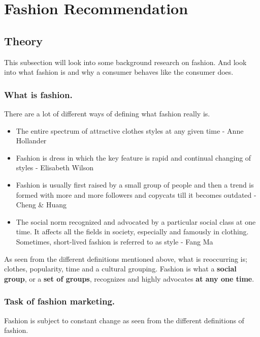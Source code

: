 
\section{Fashion Recommendation}


\subsection{Theory}
This subsection will look into some background research on fashion.  And look
into what fashion is and why a consumer behaves like the consumer does.

\subsubsection{What is fashion.}

There are a lot of different ways of defining what fashion really is.

\begin{itemize}
    \item The entire spectrum of attractive clothes styles at any given time -
    Anne Hollander
    \item Fashion is dress in which the key feature is rapid and continual
    changing of styles - Elisabeth Wilson
    \item Fashion is usually first raised by a small group of people and then a
    trend is formed with more and more followers and copycats till it becomes
    outdated - Cheng \& Huang
    \item The social norm recognized and advocated by a particular social class
    at one time. It affects all the fields in society, especially and famously
    in clothing. Sometimes, short-lived fashion is referred to as style - Fang
    Ma \cite{Fang2012}
\end{itemize}

As seen from the different definitions mentioned above, what is reoccurring is;
clothes, popularity, time and a cultural grouping. Fashion is what a
\textbf{social group}, or a \textbf{set of groups}, recognizes and highly
advocates \textbf{at any one time}.

\subsubsection{Task of fashion marketing.}
Fashion is subject to constant change as seen from the different definitions of
fashion.

